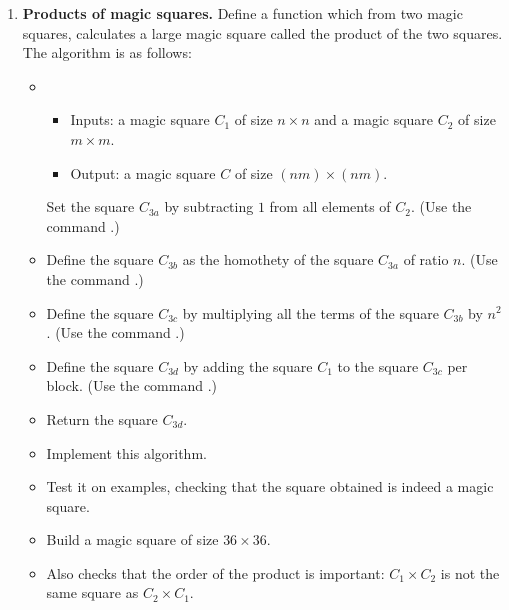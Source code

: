 \documentclass[11pt,class=report,crop=false]{standalone}
\begin{document}
\begin{activite}
\begin{enumerate}
 \item \textbf{Products of magic squares.} Define a function  which from two magic squares, calculates a large magic square called the product of the two squares. The algorithm is as follows:

 \begin{algorithme}
  \sauteligne 
 \begin{itemize}
   \item
   \begin{itemize}
     \item Inputs: a magic square $C_1$ of size $n\times n$ and a magic square $C_2$ of size $m\times m$.
     \item Output: a magic square $C$ of size $(nm)\times(nm)$.
   \end{itemize}

  Set the square $C_{3a}$ by subtracting $1$ from all elements of $C_2$. (Use the command .)
  
  \item Define the square $C_{3b}$ as the homothety of the square $C_{3a}$ of ratio $n$. (Use the command .)
  
  \item Define the square $C_{3c}$ by multiplying all the terms of the square $C_{3b}$ by $n^2$. (Use the command .)
  
  \item Define the square $C_{3d}$ by adding the square $C_1$ to the square $C_{3c}$ per block. (Use the command .)
  
  \item Return the square $C_{3d}$.
   
 \end{itemize}  
 \end{algorithme}
 
 \begin{itemize}
   \item Implement this algorithm. 
   \item Test it on examples, checking that the square obtained is indeed a magic square.
   \item Build a magic square of size $36 \times 36$.
   \item Also checks that the order of the product is important: $C_1 \times C_2$ is not the same square as $C_2 \times C_1$. 
  \end{itemize}  

\end{enumerate}

\end{activite}
\end{document}
